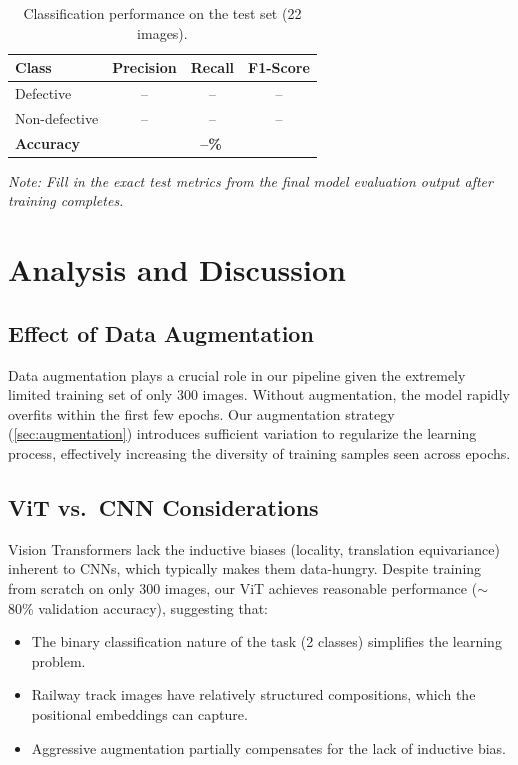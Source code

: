 \documentclass[10pt,twocolumn,letterpaper]{article}
\begin{document}
\begin{table}[h]
\centering
\caption{Classification performance on the test set (22 images).}
\label{tab:test_results}
\begin{tabular}{lccc}
\toprule
\textbf{Class} & \textbf{Precision} & \textbf{Recall} & \textbf{F1-Score} \\
\midrule
Defective       & --  & --  & --  \\
Non-defective   & --  & --  & --  \\
\midrule
\textbf{Accuracy} & \multicolumn{3}{c}{\textbf{--\%}} \\
\bottomrule
\end{tabular}
\end{table}

\textit{Note: Fill in the exact test metrics from the final model evaluation output after training completes.}

\section{Analysis and Discussion}
\label{sec:analysis}

\subsection{Effect of Data Augmentation}

Data augmentation plays a crucial role in our pipeline given the extremely limited training set of only 300 images. Without augmentation, the model rapidly overfits within the first few epochs. Our augmentation strategy (\cref{sec:augmentation}) introduces sufficient variation to regularize the learning process, effectively increasing the diversity of training samples seen across epochs.

\subsection{ViT vs.\ CNN Considerations}

Vision Transformers lack the inductive biases (locality, translation equivariance) inherent to CNNs, which typically makes them data-hungry. Despite training from scratch on only 300 images, our ViT achieves reasonable performance ($\sim$80\% validation accuracy), suggesting that:
\begin{itemize}
    \item The binary classification nature of the task (2 classes) simplifies the learning problem.
    \item Railway track images have relatively structured compositions, which the positional embeddings can capture.
    \item Aggressive augmentation partially compensates for the lack of inductive bias.
\end{itemize}
\end{document}
